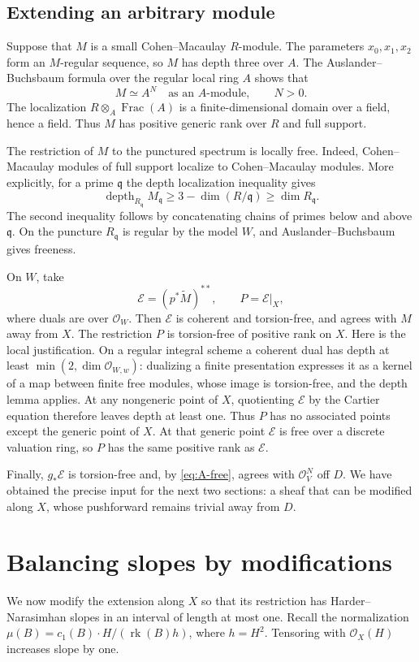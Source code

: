\documentclass[11pt]{article}
\theoremstyle{remark}
\newcommand{\cO}{\mathcal O}
\newcommand{\cE}{\mathcal E}
\DeclareMathOperator{\rk}{rk}
\DeclareMathOperator{\depth}{depth}
\DeclareMathOperator{\Frac}{Frac}
\begin{document}
\subsection{Extending an arbitrary module}
Suppose that $M$ is a small Cohen--Macaulay $R$-module. The parameters
$x_0,x_1,x_2$ form an $M$-regular sequence, so $M$ has depth three over
$A$. The Auslander--Buchsbaum formula over the regular local ring $A$
\cite[Tags~00N6, 00O7 and 090V]{Stacks}
shows that
\begin{equation}\label{eq:A-free}
 M\simeq A^N\quad\text{as an $A$-module},\qquad N>0.
\end{equation}
The localization $R\otimes_A\Frac(A)$ is a finite-dimensional domain
over a field, hence a field. Thus $M$ has positive generic rank over
$R$ and full support.

The restriction of $M$ to the punctured spectrum is locally free.
Indeed, Cohen--Macaulay modules of full support localize to
Cohen--Macaulay modules. More explicitly, for a prime $\mathfrak q$ the
depth localization inequality \cite[Tag 0FCC]{Stacks} gives
\[
 \depth_{R_{\mathfrak q}}M_{\mathfrak q}
 \geq 3-\dim(R/\mathfrak q)\geq\dim R_{\mathfrak q}.
\]
The second inequality follows by concatenating chains of primes below
and above $\mathfrak q$. On the puncture $R_{\mathfrak q}$ is regular
by the model $W$, and Auslander--Buchsbaum gives freeness.

On $W$, take
\[
 \cE=(p^*\widetilde M)^{**},\qquad P=\cE|_X,
\]
where duals are over $\cO_W$. Then $\cE$ is coherent and torsion-free,
and agrees with $M$ away from $X$. The restriction $P$ is torsion-free
of positive rank on $X$. Here is the local justification. On a regular integral
scheme a coherent dual has depth at least $\min(2,\dim\cO_{W,w})$:
dualizing a finite presentation expresses it as a kernel of a map
between finite free modules, whose image is torsion-free, and the depth
lemma applies. At any nongeneric point of $X$, quotienting $\cE$ by the
Cartier equation therefore leaves depth at least one. Thus $P$ has no
associated points except the generic point of $X$. At that generic
point $\cE$ is free over a discrete valuation ring, so $P$ has the same
positive rank as $\cE$.

Finally, $g_*\cE$ is torsion-free and, by \eqref{eq:A-free}, agrees with
$\cO_V^N$ off $D$. We have obtained the precise input for the next two
sections: a sheaf that can be modified along $X$, whose pushforward
remains trivial away from $D$.

\section{Balancing slopes by modifications}\label{sec:balancing}
We now modify the extension along $X$ so that its restriction has
Harder--Narasimhan slopes in an interval of length at most one.
Recall the normalization $\mu(B)=c_1(B)\cdot H/(\rk(B)h)$, where
$h=H^2$. Tensoring with $\cO_X(H)$ increases slope by one.
\end{document}
